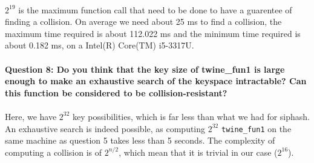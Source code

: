 \documentclass[4apaper]{report}
\begin{document}
\paragraph{} $2^{19}$ is the maximum function call that need to be done to have a guarentee of finding a collision. On average we need about 25 ms to find a collision, the maximum time required is about 112.022 ms and the minimum time required is about 0.182 ms, on a Intel(R) Core(TM) i5-3317U.

\paragraph{Question 8: Do you think that the key size of twine\_fun1 is large enough to make an exhaustive search of
the keyspace intractable? Can this function be considered to be collision-resistant?}

\paragraph{} Here, we have $2^{32}$ key possibilities, which is far less than what we had for siphash. An exhaustive search is indeed possible, as computing $2^{32}$ \texttt{twine\_fun1} on the same machine as question 5 takes less than 5 seconds. The complexity of computing a collision is of $2^{n/2}$, which mean that it is trivial in our case ($2^{16}$).
\end{document}
